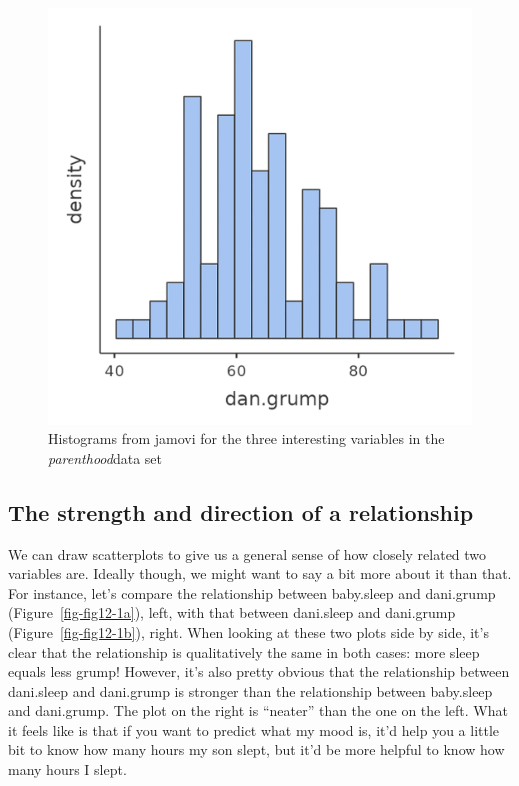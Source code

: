 \documentclass[
  a4paper,
]{book}
\begin{document}
\begin{figure}
\begin{minipage}[b]{0.33\linewidth}
{}

\subcaption{\label{fig-fig12-1b}}
\end{minipage}%
%
\begin{minipage}[b]{0.33\linewidth}

{\centering 

\includegraphics{images/fig12-1c.png}

}

\subcaption{\label{fig-fig12-1c}}
\end{minipage}%

\caption{\label{fig-fig12-1}Histograms from jamovi for the three
interesting variables in the \emph{parenthood}data set}

\end{figure}

\hypertarget{the-strength-and-direction-of-a-relationship}{%
\subsection{The strength and direction of a
relationship}\label{the-strength-and-direction-of-a-relationship}}

We can draw scatterplots to give us a general sense of how closely
related two variables are. Ideally though, we might want to say a bit
more about it than that. For instance, let's compare the relationship
between baby.sleep and dani.grump (Figure~\ref{fig-fig12-1a}), left,
with that between dani.sleep and dani.grump (Figure~\ref{fig-fig12-1b}),
right. When looking at these two plots side by side, it's clear that the
relationship is qualitatively the same in both cases: more sleep equals
less grump! However, it's also pretty obvious that the relationship
between dani.sleep and dani.grump is stronger than the relationship
between baby.sleep and dani.grump. The plot on the right is ``neater''
than the one on the left. What it feels like is that if you want to
predict what my mood is, it'd help you a little bit to know how many
hours my son slept, but it'd be more helpful to know how many hours I
slept.
\end{document}
